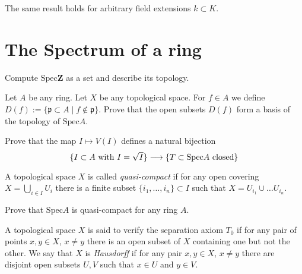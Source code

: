 \begin{remark}
The same result holds for arbitrary field extensions $k \subset K$.
\end{remark}










\section{The Spectrum of a ring}
\label{section-spectrum-ring}

\begin{exercise}
Compute $\text{Spec} \mathbf{Z}$ as a set and describe its topology.
\end{exercise}

\begin{exercise}
Let $A$ be any ring. Let $X$ be any topological space.
For $f\in A$ we define
$D(f):= \{\mathfrak p \subset A \mid f \not \in \mathfrak p\}$.
Prove that the open subsets $D(f)$ form a basis of the topology of
$\text{Spec} A$.
\end{exercise}

\begin{exercise}
Prove that the map $I\mapsto V(I)$
defines a natural bijection
$$
\{\hbox{$I\subset A$ with $I=\sqrt{I}$}\}
\longrightarrow
\{\hbox{$T\subset \text{Spec} A$ closed}\}
$$
\end{exercise}

\begin{definition}
A topological space $X$ is called {\it quasi-compact}
if for any open covering $X=\bigcup_{i\in I} U_i$ there is a finite
subset $\{i_1,\ldots,i_n\}\subset I$ such that $X=U_{i_1}\cup\ldots
U_{i_n}$. 
\end{definition}

\begin{exercise}
Prove that $\text{Spec} A$ is quasi-compact for any ring $A$.
\end{exercise}

\begin{definition}
A topological space $X$ is said to verify the separation axiom $T_0$
if for any pair of points $x,y\in X$, $x\not=y$ there is an open
subset of $X$ containing one but not the other.
We say that $X$ is {\it Hausdorff} if for any pair $x,y\in X$, $x\not=y$
there are disjoint open subsets $U, V$ such that $x\in U$
and $y\in V$.
\end{definition}


